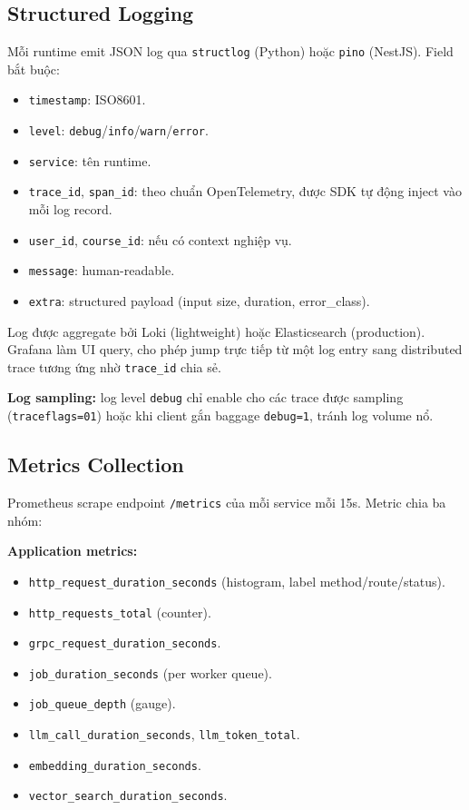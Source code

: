 \subsection{Structured Logging}

Mỗi runtime emit JSON log qua \texttt{structlog} (Python) hoặc
\texttt{pino} (NestJS). Field bắt buộc:

\begin{itemize}
    \item \texttt{timestamp}: ISO8601.
    \item \texttt{level}: \texttt{debug}/\texttt{info}/\texttt{warn}/\texttt{error}.
    \item \texttt{service}: tên runtime.
    \item \texttt{trace\_id}, \texttt{span\_id}: theo chuẩn OpenTelemetry,
          được SDK tự động inject vào mỗi log record.
    \item \texttt{user\_id}, \texttt{course\_id}: nếu có context nghiệp vụ.
    \item \texttt{message}: human-readable.
    \item \texttt{extra}: structured payload (input size, duration,
          error\_class).
\end{itemize}

Log được aggregate bởi Loki (lightweight) hoặc Elasticsearch (production).
Grafana làm UI query, cho phép jump trực tiếp từ một log entry sang
distributed trace tương ứng nhờ \texttt{trace\_id} chia sẻ.

\textbf{Log sampling:} log level \texttt{debug} chỉ enable cho các trace
được sampling (\texttt{traceflags=01}) hoặc khi client gắn baggage
\texttt{debug=1}, tránh log volume nổ.

\subsection{Metrics Collection}

Prometheus scrape endpoint \texttt{/metrics} của mỗi service mỗi 15s.
Metric chia ba nhóm:

\textbf{Application metrics:}
\begin{itemize}
    \item \texttt{http\_request\_duration\_seconds} (histogram, label
          method/route/status).
    \item \texttt{http\_requests\_total} (counter).
    \item \texttt{grpc\_request\_duration\_seconds}.
    \item \texttt{job\_duration\_seconds} (per worker queue).
    \item \texttt{job\_queue\_depth} (gauge).
    \item \texttt{llm\_call\_duration\_seconds}, \texttt{llm\_token\_total}.
    \item \texttt{embedding\_duration\_seconds}.
    \item \texttt{vector\_search\_duration\_seconds}.
\end{itemize}

